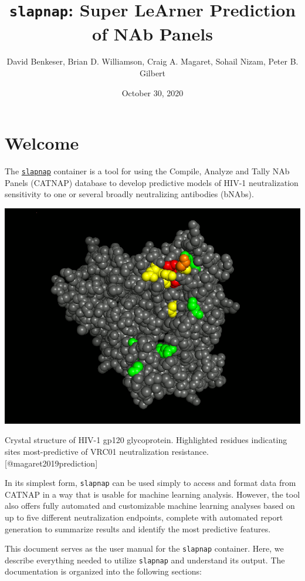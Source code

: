 \documentclass[]{article}
\title{\texttt{slapnap}: Super LeArner Prediction of NAb Panels}
\author{David Benkeser, Brian D. Williamson, Craig A. Magaret, Sohail Nizam,
Peter B. Gilbert}
\date{October 30, 2020}
\begin{document}
\maketitle

{
\setcounter{tocdepth}{2}
\tableofcontents
}
\section*{Welcome}\label{welcome}

The \href{https://hub.docker.com/r/slapnap/slapnap}{\texttt{slapnap}}
container is a tool for using the Compile, Analyze and Tally NAb Panels
(CATNAP) database to develop predictive models of HIV-1 neutralization
sensitivity to one or several broadly neutralizing antibodies (bNAbs).

\begin{center}\includegraphics[width=0.7\linewidth]{gp120} \end{center}\begin{center}
Crystal structure of HIV-1 gp120 glycoprotein. Highlighted residues
indicating sites most-predictive of VRC01 neutralization resistance.
{[}@magaret2019prediction{]}
\end{center}

In its simplest form, \texttt{slapnap} can be used simply to access and
format data from CATNAP in a way that is usable for machine learning
analysis. However, the tool also offers fully automated and customizable
machine learning analyses based on up to five different neutralization
endpoints, complete with automated report generation to summarize
results and identify the most predictive features.

This document serves as the user manual for the \texttt{slapnap}
container. Here, we describe everything needed to utilize
\texttt{slapnap} and understand its output. The documentation is
organized into the following sections:
\end{document}
